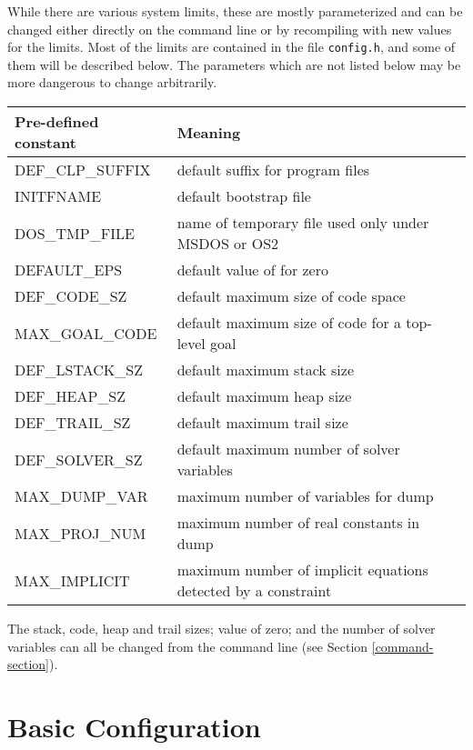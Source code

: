 While there are various system limits, these are mostly parameterized
and can be changed either directly on the command line or by
recompiling with new values for the limits.
Most of the limits are contained in the file {\tt config.h},
and some of them will be described below.
The parameters which are not listed below may be more dangerous
to change arbitrarily.

\vspace*{5mm}
\noindent
\begin{tabular}{|l|l|}
\hline
Pre-defined constant & Meaning \\ \hline
DEF\_CLP\_SUFFIX & default suffix for \CLPR{} program files\index{suffix} \\ \hline
INITFNAME & default bootstrap file \index{bootstrap}\index{init.clpr} \\ \hline
DOS\_TMP\_FILE & name of temporary file used only under MSDOS or OS2 \\ \hline
DEFAULT\_EPS & default value of for zero \index{zero} \\ \hline
DEF\_CODE\_SZ & default maximum size of code space \\ \hline
MAX\_GOAL\_CODE & default maximum size of code for a top-level goal \\ \hline
DEF\_LSTACK\_SZ & default maximum stack size \\ \hline
DEF\_HEAP\_SZ & default maximum heap size \\ \hline
DEF\_TRAIL\_SZ & default maximum trail size \\ \hline
DEF\_SOLVER\_SZ & default maximum number of solver variables \\ \hline
MAX\_DUMP\_VAR & maximum number of variables for dump \\ \hline
MAX\_PROJ\_NUM & maximum number of real constants in dump \\ \hline
MAX\_IMPLICIT & maximum number of implicit 
	equations detected by a constraint \\
\hline
\end{tabular}
\vspace*{5mm}

\noindent
The stack, code, heap and trail sizes; value of zero; and the number of
solver variables can all be changed from the command line (see Section
\ref{command-section}).

\section{Basic Configuration}

